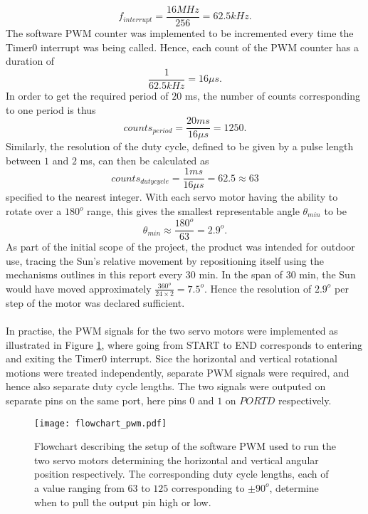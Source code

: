 \documentclass[journal]{Imperial_lab_report}
\begin{document}
\begin{equation}
f_{interrupt} = \frac{16 MHz}{256} = 62.5 kHz.
\end{equation}
The software PWM counter was implemented to be incremented every time the Timer0 interrupt was being called. Hence, each count of the PWM counter has a duration of
\begin{equation}
\frac{1}{62.5 kHz} = 16 \mu s.
\end{equation}
In order to get the required period of $20$ ms, the number of counts corresponding to one period is thus
\begin{equation}
counts_{period} = \frac{20 ms}{16 \mu s} = 1250.
\end{equation}
Similarly, the resolution of the duty cycle, defined to be given by a pulse length between $1$ and $2$ ms, can then be calculated as
\begin{equation}
counts_{duty cycle} = \frac{1 ms}{16 \mu s} = 62.5 \approx 63
\end{equation}
specified to the nearest integer. With each servo motor having the ability to rotate over a $180^{o}$ range, this gives the smallest representable angle $\theta_{min}$ to be
\begin{equation}
\label{min angle}
\theta_{min} \approx \frac{180^{o}}{63} = 2.9^{o}.
\end{equation}
As part of the initial scope of the project, the product was intended for outdoor use, tracing the Sun's relative movement by repositioning itself using the mechanisms outlines in this report every $30$ min. In the span of $30$ min, the Sun would have moved approximately $\frac{360^{o}}{24 \times 2} = 7.5^{o}$. Hence the resolution of $2.9^{o}$ per step of the motor was declared sufficient. 
\\
\\In practise, the PWM signals for the two servo motors were implemented as illustrated in Figure \ref{pwm}, where going from START to END corresponds to entering and exiting the Timer0 interrupt. Sice the horizontal and vertical rotational motions were treated independently, separate PWM signals were required, and hence also separate duty cycle lengths. The two signals were outputed on separate pins on the same port, here pins $0$ and $1$ on $PORTD$ respectively. 

\begin{figure}[!t]
	\centering
	\texttt{[image: flowchart\_pwm.pdf]}
	\caption{Flowchart describing the setup of the software PWM used to run the two servo motors determining the horizontal and vertical angular position respectively. The corresponding duty cycle lengths, each of a value ranging from $63$ to $125$ corresponding to $\pm 90^{o}$, determine when to pull the output pin high or low. }
	\label{pwm}
\end{figure}
\end{document}
